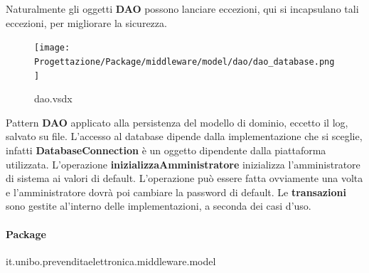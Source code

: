 \documentclass[a4paper]{article}
\begin{document}
Naturalmente gli oggetti \textbf{DAO} possono lanciare eccezioni, qui si incapsulano tali eccezioni, per migliorare la sicurezza.

\newpage

\begin{figure}[H]
    \texttt{[image: Progettazione/Package/middleware/model/dao/dao\_database.png]}
    \centering
    \caption{dao.vsdx}
\end{figure}

Pattern \textbf{DAO} applicato alla persistenza del modello di dominio, eccetto il log, salvato su file. L'accesso al database dipende dalla implementazione che si sceglie, infatti \textbf{DatabaseConnection} è un oggetto dipendente dalla piattaforma utilizzata. L'operazione \textbf{inizializzaAmministratore} inizializza l'amministratore di sistema ai valori di default. L'operazione può essere fatta ovviamente una volta e l'amministratore dovrà poi cambiare la password di default. Le \textbf{transazioni} sono gestite al'interno delle implementazioni, a seconda dei casi d'uso.








\newpage

\paragraph{Package} it.unibo.prevenditaelettronica.middleware.model
\end{document}
